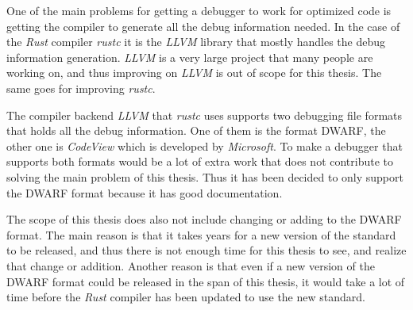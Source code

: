 




One of the main problems for getting a debugger to work for optimized code is getting the compiler to generate all the debug information needed.
In the case of the \emph{Rust} compiler \emph{rustc} it is the \emph{LLVM} library that mostly handles the debug information generation.
\emph{LLVM} is a very large project that many people are working on, and thus improving on \emph{LLVM} is out of scope for this thesis.
The same goes for improving \emph{rustc}.


The compiler backend \emph{LLVM} that \emph{rustc} uses supports two debugging file formats that holds all the debug information.
One of them is the format \gls{DWARF}, the other one is \emph{CodeView} which is developed by \emph{Microsoft}.
To make a debugger that supports both formats would be a lot of extra work that does not contribute to solving the main problem of this thesis.
Thus it has been decided to only support the \gls{DWARF} format because it has good documentation.


The scope of this thesis does also not include changing or adding to the \gls{DWARF} format.
The main reason is that it takes years for a new version of the standard to be released, and thus there is not enough time for this thesis to see, and realize that change or addition.
Another reason is that even if a new version of the \gls{DWARF} format could be released in the span of this thesis, it would take a lot of time before the \emph{Rust} compiler has been updated to use the new standard.


